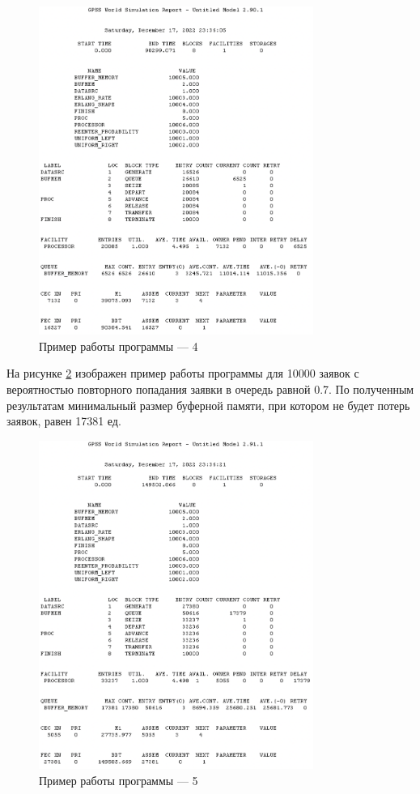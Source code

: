 \documentclass[12pt]{report}
\begin{document}
\begin{figure}[h!btp]
	\centering
	\includegraphics[width=0.8\textwidth]{inc/pic4.png}
	\caption{Пример работы программы --- 4}
	\label{fig:pic4}	
\end{figure}
\clearpage

На рисунке \ref{fig:pic5} изображен пример работы программы для 10000 заявок с вероятностью повторного попадания заявки в очередь равной 0.7. По полученным результатам минимальный размер буферной памяти, при котором не будет потерь заявок, равен 17381 ед.

\begin{figure}[h!btp]
	\centering
	\includegraphics[width=0.8\textwidth]{inc/pic5.png}
	\caption{Пример работы программы --- 5}
	\label{fig:pic5}	
\end{figure}
\clearpage
\end{document}
